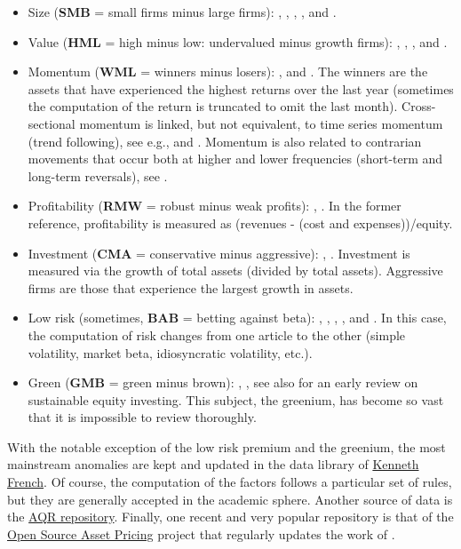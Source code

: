 \begin{itemize}
\item Size (\textbf{SMB} = small firms minus large firms): \cite{banz1981relationship}, \cite{fama1992cross}, \cite{fama1993common}, \cite{van2011size}, \cite{asness2018size} and \cite{astakhov2019firm}.
\item Value (\textbf{HML} = high minus low: undervalued minus growth firms): \cite{fama1992cross}, \cite{fama1993common}, \cite{asness2013devil}, and \cite{asness2013value}.
\item Momentum (\textbf{WML} = winners minus losers): \cite{jegadeesh1993returns}, \cite{carhart1997persistence} and \cite{asness2013value}. The winners are the assets that have experienced the highest returns over the last year (sometimes the computation of the return is truncated to omit the last month). Cross-sectional momentum is linked, but not equivalent, to time series momentum (trend following), see e.g., \cite{moskowitz2012time} and \cite{lemperiere2014two}. Momentum is also related to contrarian movements that occur both at higher and lower frequencies (short-term and long-term reversals), see \cite{luo2020momentum}.
\item Profitability (\textbf{RMW} = robust minus weak profits): \cite{fama2015five}, \cite{bouchaud2019sticky}. In the former reference, profitability is measured as (revenues - (cost and expenses))/equity.
\item Investment (\textbf{CMA} = conservative minus aggressive): \cite{fama2015five}, \cite{hou2015digesting}. Investment is measured via the growth of total assets (divided by total assets). Aggressive firms are those that experience the largest growth in assets.
\item Low risk (sometimes, \textbf{BAB} = betting against beta): \cite{ang2006cross}, \cite{baker2011benchmarks}, \cite{frazzini2014betting}, \cite{boloorforoosh2019beta}, \cite{baker2019leverage} and \cite{asness2020betting}. In this case, the computation of risk changes from one article to the other (simple volatility, market beta, idiosyncratic volatility, etc.).
\item Green (\textbf{GMB} = green minus brown): \cite{pastor2021sustainable}, \cite{lioui2022chasing}, see also \cite{coqueret2022perspectives} for an early review on sustainable equity investing. This subject, the greenium, has become so vast that it is impossible to review thoroughly.
\end{itemize}

With the notable exception of the low risk premium and the greenium, the most mainstream anomalies are kept and updated in the data library of \href{https://mba.tuck.dartmouth.edu/pages/faculty/ken.french/data\_library.html}{Kenneth French}. Of course, the computation of the factors follows a particular set of rules, but they are generally accepted in the academic sphere. Another source of data is the \href{https://www.aqr.com/Insights/Datasets}{AQR repository}. Finally, one recent and very popular repository is that of the \href{https://www.openassetpricing.com/}{Open Source Asset Pricing} project that regularly updates the work of \cite{chen2021open}.

